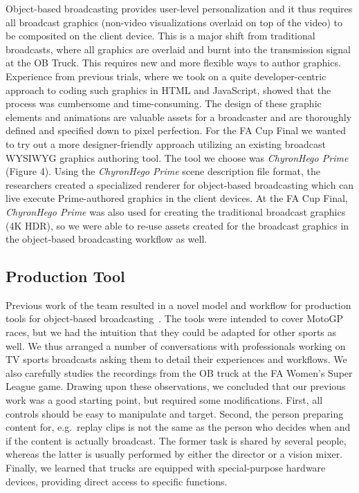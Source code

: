\documentclass[sigchi-a, authorversion]{acmart}
\begin{document}
Object-based broadcasting provides user-level personalization and it thus
requires all broadcast graphics (non-video visualizations overlaid on top of
the video) to be composited on the client device. This is a major shift from
traditional broadcasts, where all graphics are overlaid and burnt into the
transmission signal at the OB Truck. This requires new and more flexible ways
to author graphics. Experience from previous trials, where we took on a quite
developer-centric approach to coding such graphics in HTML and JavaScript,
showed that the process was cumbersome and time-consuming. The design of these
graphic elements and animations are valuable assets for a broadcaster and are
thoroughly defined and specified down to pixel perfection. For the FA Cup Final
we wanted to try out a more designer-friendly approach utilizing an existing
broadcast WYSIWYG graphics authoring tool. The tool we choose was
\emph{ChyronHego Prime} (Figure 4). Using the \emph{ChyronHego Prime} scene
description file format, the researchers created a specialized renderer for
object-based broadcasting which can live execute Prime-authored graphics in the
client devices. At the FA Cup Final, \emph{ChyronHego Prime} was also used for
creating the traditional broadcast graphics (4K HDR), so we were able to re-use
assets created for the broadcast graphics in the object-based broadcasting
workflow as well.

\subsection{Production Tool}

Previous work of the team resulted in a novel model and workflow for
production tools for object-based broadcasting~\cite{Li:2018_TVX,jansen2018}.
The tools were intended to cover MotoGP races, but we had the intuition that
they could be adapted for other sports as well. We thus arranged a number
of conversations with professionals working on TV sports broadcasts asking them to
detail their experiences and workflows. We also carefully
studies the recordings from the OB truck at the FA Women's Super League
game. Drawing upon these observations, we concluded that our previous
work was a good starting point, but required some modifications. First, all
controls should be easy to manipulate and target. Second, the person
preparing content for, e.g.\ replay clips is not the same as the
person who decides when and if the content is actually broadcast. The
former task is shared by several people, whereas the latter is usually performed
by either the director or a vision mixer. Finally, we learned that trucks
are equipped with special-purpose hardware devices, providing direct access to
specific functions.
\end{document}
